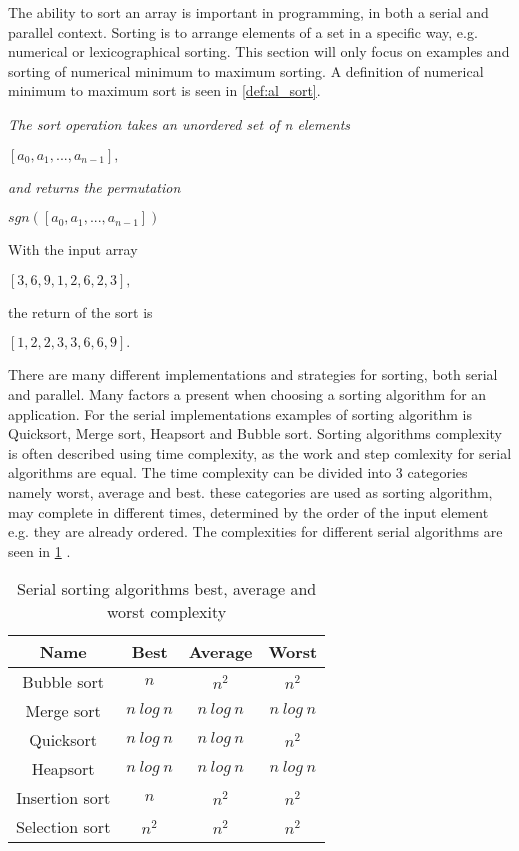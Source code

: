 The ability to sort an array is important in programming, in both a serial and parallel context. Sorting is to arrange elements of a set in a specific way, e.g. numerical or lexicographical sorting. This section will only focus on examples and sorting of numerical minimum to maximum sorting. A definition of numerical minimum to maximum sort is seen in \cref{def:al_sort}.   

\begin{definition}
	\label{def:al_sort}
	\textit{The sort operation takes an unordered set of n elements}
	\begin{center}
		$[a_0,a_1,...,a_{n-1}],$
	\end{center}
	\textit{and returns the permutation}
	\begin{center}
		$sgn([a_0,a_1,...,a_{n-1}])$
	\end{center}
\end{definition}
\begin{example}
	With the input array
	\begin{center}
		$[3,6,9,1,2,6,2,3],$
	\end{center}
	the return of the sort is
	\begin{center}
		$[1,2,2,3,3,6,6,9].$
	\end{center}
\end{example}

There are many different implementations and strategies for sorting, both serial and parallel. Many factors a present when choosing a sorting algorithm for an application. For the serial implementations examples of sorting algorithm is Quicksort, Merge sort, Heapsort and Bubble sort. Sorting algorithms complexity is often described using time complexity, as the work and step comlexity for serial algorithms are equal. The time complexity can be divided into 3 categories namely worst, average and best. these categories are used as sorting algorithm, may complete in different times, determined by the order of the input element e.g. they are already ordered. The complexities for different serial algorithms are seen in \cref{tab:serial_sort} \cite{wiki:sort}. 

\begin{table}[ht]
	\centering
	\caption{Serial sorting algorithms best, average and worst complexity}
	\label{tab:serial_sort}
	\begin{tabular}{|c|c|c|c|}
		\hline
		Name           & Best       & Average   & Worst     \\ \hline
		Bubble sort    & $n$        & $n^2$     & $n^2$     \\ \hline
		Merge sort     & $n~log~n$  & $n~log~n$ & $n~log~n$ \\ \hline
		Quicksort      & $n~log~n$  & $n~log~n$ & $n^2$     \\ \hline
		Heapsort       & $n~log~n$  & $n~log~n$ & $n~log~n$ \\ \hline
		Insertion sort & $n$        & $n^2$     & $n^2$     \\ \hline
		Selection sort & $n^2$      & $n^2$     & $n^2$     \\ \hline
	\end{tabular}
\end{table}


